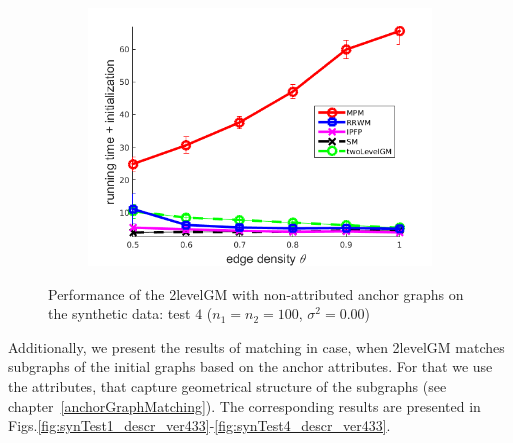 \begin{figure}[h]
\begin{subfigure}[b]{0.3\textwidth}
			\includegraphics[scale=0.25]{"chapter3/fig/SyntheticTest/no_descr/Results_v4.3.3/Test4/time_summary_avg10t"} 
		\end{subfigure} 	
	\caption[Performance of the 2levelGM with non-attributed anchor graphs on the synthetic data (test $4$)]{Performance of the 2levelGM with non-attributed anchor graphs on the synthetic data: test $4$ ($n_1=n_2=100$, $\sigma^2=0.00$)}
	\label{fig:synTest4_ver433}
\end{figure}
\FloatBarrier

Additionally, we present the results of matching in case, when 2levelGM matches subgraphs of the initial graphs based on the anchor attributes. For that we use the attributes, that capture geometrical structure of the subgraphs (see chapter~\ref{anchorGraphMatching}). The corresponding results are presented in Figs.\ref{fig:synTest1_descr_ver433}-\ref{fig:synTest4_descr_ver433}.

